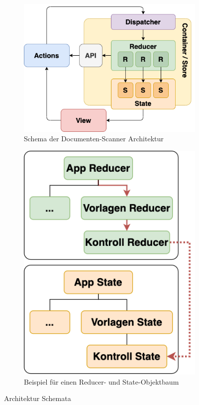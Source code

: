 \documentclass[notables, nomenclature, oneside, 150]{HSMW-Thesis}
\begin{document}
		\begin{figure}[th]
			\centering
			\begin{subfigure}[t]{0.48\textwidth}
				\centering
				\includegraphics[width=\textwidth]{img/redux.png}
				\caption{Schema der Documenten-Scanner Architektur}
				\label{fig:redux}
			\end{subfigure}
			\begin{subfigure}[t]{0.48\textwidth}
				\centering
				\includegraphics[height=0.9\textwidth]{img/tree_example.png}
				\caption{Beispiel für einen Reducer- und State-Objektbaum}
				\label{fig:tree}
			\end{subfigure}
			\caption{Architektur Schemata}
		\end{figure}
		
\end{document}
